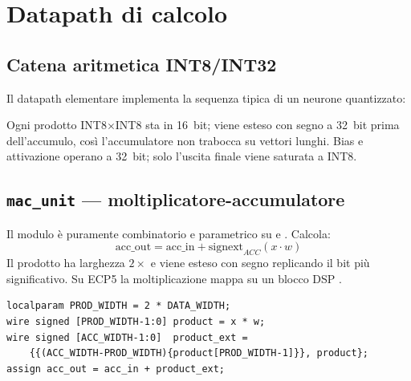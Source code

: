 \chapter{Datapath di calcolo}
\label{ch:datapath}

\section{Catena aritmetica INT8/INT32}
Il datapath elementare implementa la sequenza tipica di un neurone quantizzato:
\begin{center}
\end{center}
Ogni prodotto INT8$\times$INT8 sta in 16~bit; viene esteso con segno a 32~bit prima
dell'accumulo, così l'accumulatore non trabocca su vettori lunghi. Bias e attivazione
operano a 32~bit; solo l'uscita finale viene saturata a INT8.

\section{\texttt{mac\_unit} --- moltiplicatore-accumulatore}
Il modulo  è puramente combinatorio e parametrico su 
e . Calcola:
\[
\mathrm{acc\_out} = \mathrm{acc\_in} + \mathrm{signext}_{ACC}(x \cdot w)
\]
Il prodotto ha larghezza $2\times$ e viene esteso con segno replicando
il bit più significativo. Su ECP5 la moltiplicazione mappa su un blocco DSP
.

\begin{lstlisting}[caption={\texttt{rtl/mac\_unit.v} --- nucleo aritmetico},label={lst:macunit}]
localparam PROD_WIDTH = 2 * DATA_WIDTH;
wire signed [PROD_WIDTH-1:0] product = x * w;
wire signed [ACC_WIDTH-1:0]  product_ext =
    {{(ACC_WIDTH-PROD_WIDTH){product[PROD_WIDTH-1]}}, product};
assign acc_out = acc_in + product_ext;
\end{lstlisting}

